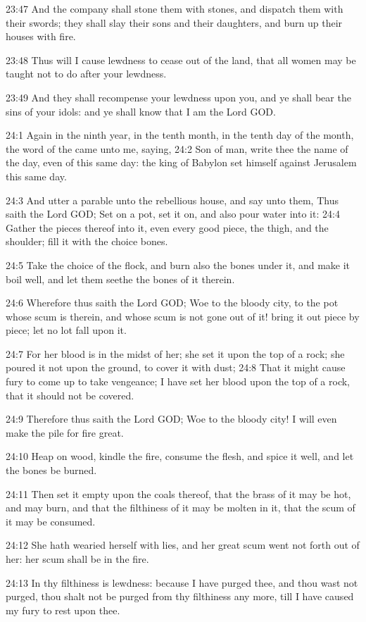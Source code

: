23:47 And the company shall stone them with stones, and dispatch them
with their swords; they shall slay their sons and their daughters, and
burn up their houses with fire.

23:48 Thus will I cause lewdness to cease out of the land, that all
women may be taught not to do after your lewdness.

23:49 And they shall recompense your lewdness upon you, and ye shall
bear the sins of your idols: and ye shall know that I am the Lord GOD.

24:1 Again in the ninth year, in the tenth month, in the tenth day of
the month, the word of the \LORD came unto me, saying, 24:2 Son of man,
write thee the name of the day, even of this same day: the king of
Babylon set himself against Jerusalem this same day.

24:3 And utter a parable unto the rebellious house, and say unto them,
Thus saith the Lord GOD; Set on a pot, set it on, and also pour water
into it: 24:4 Gather the pieces thereof into it, even every good
piece, the thigh, and the shoulder; fill it with the choice bones.

24:5 Take the choice of the flock, and burn also the bones under it,
and make it boil well, and let them seethe the bones of it therein.

24:6 Wherefore thus saith the Lord GOD; Woe to the bloody city, to the
pot whose scum is therein, and whose scum is not gone out of it! bring
it out piece by piece; let no lot fall upon it.

24:7 For her blood is in the midst of her; she set it upon the top of
a rock; she poured it not upon the ground, to cover it with dust; 24:8
That it might cause fury to come up to take vengeance; I have set her
blood upon the top of a rock, that it should not be covered.

24:9 Therefore thus saith the Lord GOD; Woe to the bloody city! I will
even make the pile for fire great.

24:10 Heap on wood, kindle the fire, consume the flesh, and spice it
well, and let the bones be burned.

24:11 Then set it empty upon the coals thereof, that the brass of it
may be hot, and may burn, and that the filthiness of it may be molten
in it, that the scum of it may be consumed.

24:12 She hath wearied herself with lies, and her great scum went not
forth out of her: her scum shall be in the fire.

24:13 In thy filthiness is lewdness: because I have purged thee, and
thou wast not purged, thou shalt not be purged from thy filthiness any
more, till I have caused my fury to rest upon thee.

